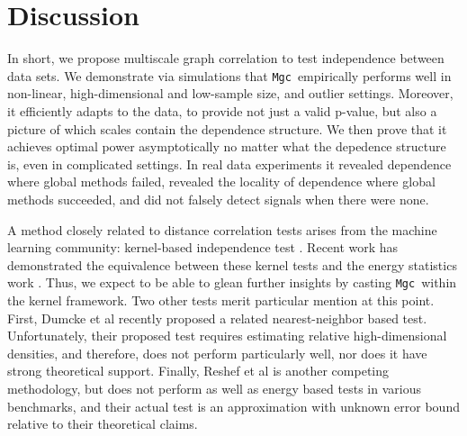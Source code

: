 \documentclass[11pt]{article}
\providecommand{\sct}[1]{{\sc \texttt{#1}}}
\newcommand{\Mgc}{\sct{Mgc}}
\begin{document}
\section{Discussion}
\label{conclu}

In short, we propose multiscale graph correlation to test independence between data sets. 
We demonstrate via simulations that \Mgc~empirically performs well in non-linear, high-dimensional and low-sample size, and outlier settings.  Moreover, it efficiently adapts to the data, to provide not just a valid p-value, but also a picture of which scales contain the dependence structure. We then prove that it achieves optimal power asymptotically no matter what the depedence structure is, even in complicated settings.  In real data experiments it revealed dependence where global methods failed, revealed the locality of dependence where global methods succeeded, and did not falsely detect signals when there were none.




A method closely related to distance correlation tests arises from the machine learning community: kernel-based independence test  \cite{GrettonEtAl2005, GrettonGyorfi2010, GrettonEtAl2012}.  Recent work has demonstrated the equivalence between these kernel tests and the energy statistics work \cite{SejdinovicEtAl2013, RamdasEtAl2015}. Thus, we expect to be able to glean further insights by casting \Mgc~within the kernel framework.  Two other tests merit particular mention at this point.  First, Dumcke et al \cite{Dumcke2014} recently proposed a related nearest-neighbor based test.  Unfortunately, their proposed test requires estimating relative high-dimensional densities, and therefore, does not perform particularly well, nor does it have strong theoretical support. 
Finally, Reshef et al \cite{Reshef2011} is another competing methodology, but does not perform as well as energy based tests in various benchmarks, and their actual test is an approximation with unknown error bound relative to their theoretical claims.  
\end{document}
